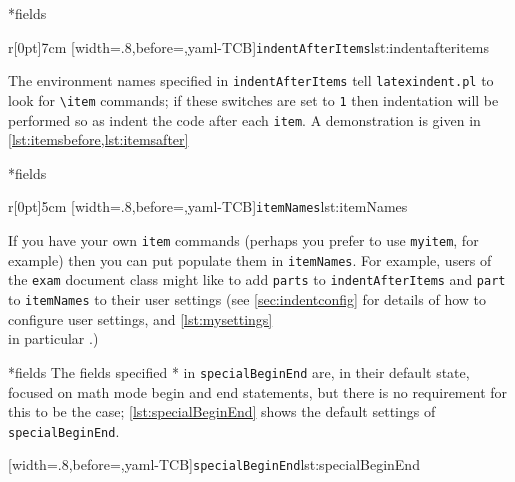 *{fields}
	\begin{wrapfigure}[5]{r}[0pt]{7cm}
		[width=.8\linewidth,before=\centering,yaml-TCB]{\texttt{indentAfterItems}}{lst:indentafteritems}
	\end{wrapfigure}
	The environment names specified in \texttt{indentAfterItems}  tell
	\texttt{latexindent.pl} to look for \lstinline!\item! commands; if these switches are set to \texttt{1}
	then indentation will be performed so as indent the code after each \texttt{item}.
	A demonstration is given in \cref{lst:itemsbefore,lst:itemsafter}

	\begin{minipage}{.45\textwidth}
	\end{minipage}%
	\hfill
	\begin{minipage}{.45\textwidth}
	\end{minipage}

*{fields}
	\begin{wrapfigure}[5]{r}[0pt]{5cm}
		[width=.8\linewidth,before=\centering,yaml-TCB]{\texttt{itemNames}}{lst:itemNames}
	\end{wrapfigure}
	If you have your own \texttt{item} commands (perhaps you
	prefer to use \texttt{myitem}, for example)
	then you can put populate them in \texttt{itemNames}.
	For example, users of the \texttt{exam} document class might like to add
	\texttt{parts} to \texttt{indentAfterItems} and \texttt{part} to \texttt{itemNames}
	to their user settings (see \vref{sec:indentconfig} for details of how to configure user settings,
	and \vref{lst:mysettings} \\ in particular \label{page:examsettings}.)

*{fields}\label{yaml:specialBeginEnd}
	The fields specified * in \texttt{specialBeginEnd} are, in their default state, focused on math mode begin and end statements, but
	there is no requirement for this to be the case; \cref{lst:specialBeginEnd} shows the
	default settings of \texttt{specialBeginEnd}.

	[width=.8\linewidth,before=\centering,yaml-TCB]{\texttt{specialBeginEnd}}{lst:specialBeginEnd}

